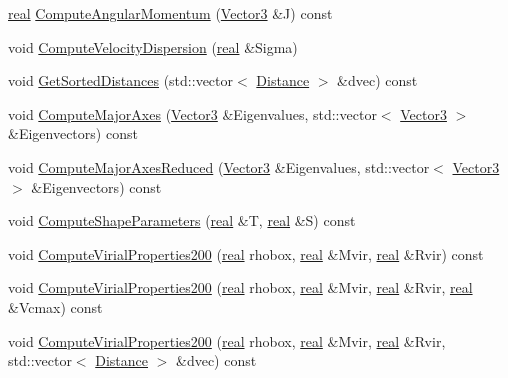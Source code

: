 \begin{DoxyCompactItemize}
\item 
\hyperlink{Global_8h_a031f8951175b43076c2084a6c2173410}{real} \hyperlink{classHaloProperties_a15228365bc6e1546e47589a4b0403463}{ComputeAngularMomentum} (\hyperlink{classVector3}{Vector3} \&J) const 
\item 
void \hyperlink{classHaloProperties_a609180764606ba7ab3658b545e89c7f0}{ComputeVelocityDispersion} (\hyperlink{Global_8h_a031f8951175b43076c2084a6c2173410}{real} \&Sigma)
\item 
void \hyperlink{classHaloProperties_a60b7ef82eee29ae676d28b9c819d1efb}{GetSortedDistances} (std::vector$<$ \hyperlink{classHaloProperties_1_1Distance}{Distance} $>$ \&dvec) const 
\item 
void \hyperlink{classHaloProperties_aadfc56fbb88702866ade01fc1168a53e}{ComputeMajorAxes} (\hyperlink{classVector3}{Vector3} \&Eigenvalues, std::vector$<$ \hyperlink{classVector3}{Vector3} $>$ \&Eigenvectors) const 
\item 
void \hyperlink{classHaloProperties_a2fe7ded61657178551618214d0a978b8}{ComputeMajorAxesReduced} (\hyperlink{classVector3}{Vector3} \&Eigenvalues, std::vector$<$ \hyperlink{classVector3}{Vector3} $>$ \&Eigenvectors) const 
\item 
void \hyperlink{classHaloProperties_afaabf0499b36b0e507a855763c6a2144}{ComputeShapeParameters} (\hyperlink{Global_8h_a031f8951175b43076c2084a6c2173410}{real} \&T, \hyperlink{Global_8h_a031f8951175b43076c2084a6c2173410}{real} \&S) const 
\item 
void \hyperlink{classHaloProperties_a6191e30ad371b6cdca9ec054da9c45c6}{ComputeVirialProperties200} (\hyperlink{Global_8h_a031f8951175b43076c2084a6c2173410}{real} rhobox, \hyperlink{Global_8h_a031f8951175b43076c2084a6c2173410}{real} \&Mvir, \hyperlink{Global_8h_a031f8951175b43076c2084a6c2173410}{real} \&Rvir) const 
\item 
void \hyperlink{classHaloProperties_a21ee7112bdd7d5c77f91bbd3d87a2f7d}{ComputeVirialProperties200} (\hyperlink{Global_8h_a031f8951175b43076c2084a6c2173410}{real} rhobox, \hyperlink{Global_8h_a031f8951175b43076c2084a6c2173410}{real} \&Mvir, \hyperlink{Global_8h_a031f8951175b43076c2084a6c2173410}{real} \&Rvir, \hyperlink{Global_8h_a031f8951175b43076c2084a6c2173410}{real} \&Vcmax) const 
\item 
void \hyperlink{classHaloProperties_a473124bc8991382b9db3137448acfec9}{ComputeVirialProperties200} (\hyperlink{Global_8h_a031f8951175b43076c2084a6c2173410}{real} rhobox, \hyperlink{Global_8h_a031f8951175b43076c2084a6c2173410}{real} \&Mvir, \hyperlink{Global_8h_a031f8951175b43076c2084a6c2173410}{real} \&Rvir, std::vector$<$ \hyperlink{classHaloProperties_1_1Distance}{Distance} $>$ \&dvec) const 

\end{DoxyCompactItemize}
